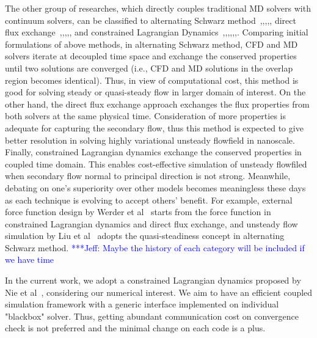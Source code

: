 \documentclass[conference,final]{IEEEtran}
\newcommand{\skonote}[1]{ {\textcolor{blue} { ***Jeff: #1 }}}
\newcommand{\skonote}[1]{}
\begin{document}
The other group of researches, which directly couples traditional MD solvers with continuum solvers, can be classified to alternating Schwarz method~\cite{Hadjicon1},\cite{Hadjicon3},\cite{Hadjicon2},\cite{Werder},\cite{Kotsalis}, direct flux exchange~\cite{Flekkoy},\cite{Wagner},\cite{USHER},\cite{Time_Mechanism},\cite{Giupponi}, and constrained Lagrangian Dynamics~\cite{Thompson},\cite{Nie},\cite{Nie_cavity},\cite{Cui},\cite{Wang},\cite{Yen},\cite{Liu}. Comparing initial formulations of above methods, in alternating Schwarz method, CFD and MD solvers iterate at decoupled time space and exchange the conserved properties until two solutions are converged (i.e., CFD and MD solutions in the overlap region becomes identical). Thus, in view of computational cost, this method is good for solving steady or quasi-steady flow in larger domain of interest. On the other hand, the direct flux exchange approach exchanges the flux properties from both solvers at the same physical time. Consideration of more properties is adequate for capturing the secondary flow, thus this method is expected to give better resolution in solving highly variational unsteady flowfield in nanoscale. Finally, constrained Lagrangian dynamics exchange the conserved properties in coupled time domain. This enables cost-effective simulation of unsteady flowfiled when secondary flow normal to principal direction is not strong. Meanwhile, debating on one's superiority over other models becomes meaningless these days as each technique is evolving to accept others' benefit. For example, external force function design by Werder et al~\cite{Werder} starts from the force function in constrained Lagrangian dynamics and direct flux exchange, and unsteady flow simulation by Liu et al~\cite{Liu} adopts the quasi-steadiness concept in alternating Schwarz method.
\skonote{Maybe the history of each category will be included if we have time}

In the current work, we adopt a constrained Lagrangian dynamics proposed by Nie et al~\cite{Nie}, considering our numerical interest. We aim to have an efficient coupled simulation framework with a generic interface implemented on individual "blackbox" solver. Thus, getting abundant communication cost on convergence check is not preferred and the minimal change on each code is a plus.

\end{document}
